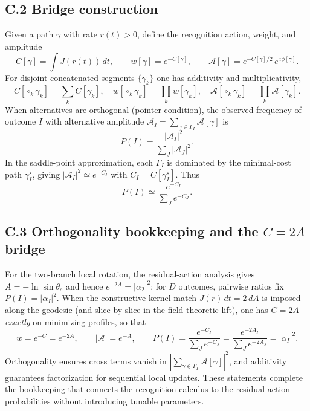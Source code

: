 \documentclass[11pt,letterpaper]{article}
\theoremstyle{definition}
\begin{document}
\subsection*{C.2 Bridge construction}

Given a path $\gamma$ with rate $r(t)>0$, define the recognition action, weight, and amplitude
\begin{equation}
C[\gamma]=\int J(r(t))\,dt,\qquad
w[\gamma]=e^{-C[\gamma]},\qquad
\mathcal A[\gamma]=e^{-C[\gamma]/2}\,e^{\,i\phi[\gamma]}.
\end{equation}
For disjoint concatenated segments $\{\gamma_k\}$ one has additivity and multiplicativity,
\begin{equation}
C[\circ_k\gamma_k]=\sum_k C[\gamma_k],\quad
w[\circ_k\gamma_k]=\prod_k w[\gamma_k],\quad
\mathcal A[\circ_k\gamma_k]=\prod_k \mathcal A[\gamma_k].
\end{equation}
When alternatives are orthogonal (pointer condition), the observed frequency of outcome $I$ with alternative amplitude $\mathcal A_I=\sum_{\gamma\in\Gamma_I}\mathcal A[\gamma]$ is
\begin{equation}
P(I)=\frac{|\mathcal A_I|^2}{\sum_J |\mathcal A_J|^2}.
\end{equation}
In the saddle-point approximation, each $\Gamma_I$ is dominated by the minimal-cost path $\gamma_I^\star$, giving $|\mathcal A_I|^2\simeq e^{-C_I}$ with $C_I=C[\gamma_I^\star]$. Thus
\begin{equation}
P(I)\simeq \frac{e^{-C_I}}{\sum_J e^{-C_J}}.
\end{equation}

\subsection*{C.3 Orthogonality bookkeeping and the $C=2A$ bridge}

For the two-branch local rotation, the residual-action analysis gives $A=-\ln\sin\theta_s$ and hence $e^{-2A}=|\alpha_2|^2$; for $D$ outcomes, pairwise ratios fix $P(I)=|\alpha_I|^2$. When the constructive kernel match $J(r)\,dt=2\,dA$ is imposed along the geodesic (and slice-by-slice in the field-theoretic lift), one has $C=2A$ \emph{exactly} on minimizing profiles, so that
\begin{equation}
w=e^{-C}=e^{-2A},\qquad
|\mathcal A|=e^{-A},\qquad
P(I)=\frac{e^{-C_I}}{\sum_J e^{-C_J}}=\frac{e^{-2A_I}}{\sum_J e^{-2A_J}}=|\alpha_I|^2.
\end{equation}
Orthogonality ensures cross terms vanish in $|\sum_{\gamma\in\Gamma_I}\mathcal A[\gamma]|^2$, and additivity guarantees factorization for sequential local updates. These statements complete the bookkeeping that connects the recognition calculus to the residual-action probabilities without introducing tunable parameters. %
\end{document}
